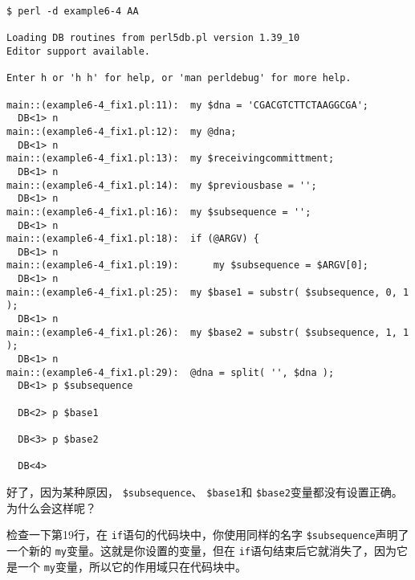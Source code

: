 %
%
%
%
%
%
\begin{lstlisting}
$ perl -d example6-4 AA

Loading DB routines from perl5db.pl version 1.39_10
Editor support available.

Enter h or 'h h' for help, or 'man perldebug' for more help.

main::(example6-4_fix1.pl:11):	my $dna = 'CGACGTCTTCTAAGGCGA';
  DB<1> n
main::(example6-4_fix1.pl:12):	my @dna;
  DB<1> n
main::(example6-4_fix1.pl:13):	my $receivingcommittment;
  DB<1> n
main::(example6-4_fix1.pl:14):	my $previousbase = '';
  DB<1> n
main::(example6-4_fix1.pl:16):	my $subsequence = '';
  DB<1> n
main::(example6-4_fix1.pl:18):	if (@ARGV) {
  DB<1> n
main::(example6-4_fix1.pl:19):	    my $subsequence = $ARGV[0];
  DB<1> n
main::(example6-4_fix1.pl:25):	my $base1 = substr( $subsequence, 0, 1 );
  DB<1> n
main::(example6-4_fix1.pl:26):	my $base2 = substr( $subsequence, 1, 1 );
  DB<1> n
main::(example6-4_fix1.pl:29):	@dna = split( '', $dna );
  DB<1> p $subsequence

  DB<2> p $base1

  DB<3> p $base2

  DB<4> 
\end{lstlisting}

好了，因为某种原因， \verb|$subsequence|、 \verb|$base1|和 \verb|$base2|变量都没有设置正确。为什么会这样呢？

检查一下第19行，在 \verb|if|语句的代码块中，你使用同样的名字 \verb|$subsequence|声明了一个新的 \verb|my|变量。这就是你设置的变量，但在 \verb|if|语句结束后它就消失了，因为它是一个 \verb|my|变量，所以它的作用域只在代码块中。

